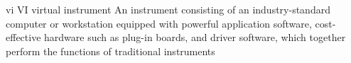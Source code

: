 \newglsXacronym%
{vi}%
{VI}%
{virtual instrument}%
{An instrument consisting of an industry-standard computer or workstation equipped with powerful application software, cost-effective hardware such as plug-in boards, and driver software, which together perform the functions of traditional instruments}%